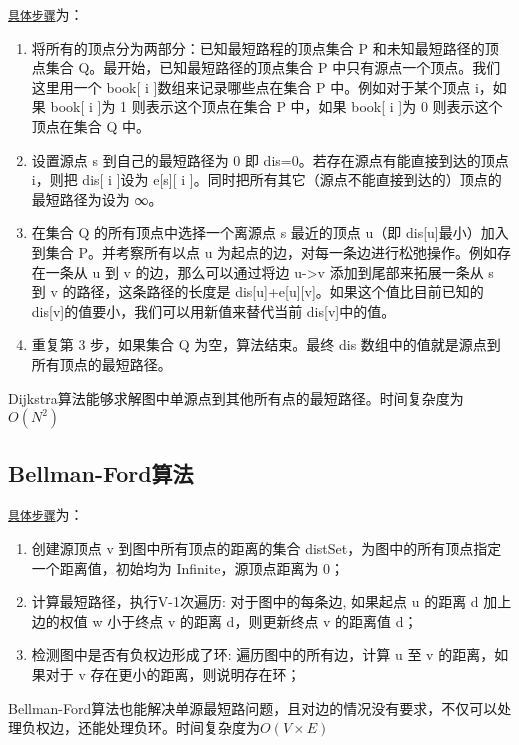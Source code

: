 \href{http://wiki.jikexueyuan.com/project/easy-learn-algorithm/dijkstra.html}{\texttt{具体步骤}}为：
\begin{enumerate}
\item 将所有的顶点分为两部分：已知最短路程的顶点集合 P 和未知最短路径的顶点集合 Q。最开始，已知最短路径的顶点集合 P 中只有源点一个顶点。我们这里用一个 book[ i ]数组来记录哪些点在集合 P 中。例如对于某个顶点 i，如果 book[ i ]为 1 则表示这个顶点在集合 P 中，如果 book[ i ]为 0 则表示这个顶点在集合 Q 中。
\item 设置源点 s 到自己的最短路径为 0 即 dis=0。若存在源点有能直接到达的顶点 i，则把 dis[ i ]设为 e[s][ i ]。同时把所有其它（源点不能直接到达的）顶点的最短路径为设为 ∞。
\item 在集合 Q 的所有顶点中选择一个离源点 s 最近的顶点 u（即 dis[u]最小）加入到集合 P。并考察所有以点 u 为起点的边，对每一条边进行松弛操作。例如存在一条从 u 到 v 的边，那么可以通过将边 u->v 添加到尾部来拓展一条从 s 到 v 的路径，这条路径的长度是 dis[u]+e[u][v]。如果这个值比目前已知的 dis[v]的值要小，我们可以用新值来替代当前 dis[v]中的值。
\item 重复第 3 步，如果集合 Q 为空，算法结束。最终 dis 数组中的值就是源点到所有顶点的最短路径。
\end{enumerate}

Dijkstra算法能够求解图中单源点到其他所有点的最短路径。时间复杂度为$O(N^2)$

\subsection{Bellman-Ford算法}
\href{http://www.cnblogs.com/gaochundong/p/bellman_ford_algorithm.html}{\texttt{具体步骤}}为：
\begin{enumerate}
	\item 创建源顶点 v 到图中所有顶点的距离的集合 distSet，为图中的所有顶点指定一个距离值，初始均为 Infinite，源顶点距离为 0；
	\item 计算最短路径，执行V-1次遍历: 对于图中的每条边, 如果起点 u 的距离 d 加上边的权值 w 小于终点 v 的距离 d，则更新终点 v 的距离值 d；
	\item 检测图中是否有负权边形成了环: 遍历图中的所有边，计算 u 至 v 的距离，如果对于 v 存在更小的距离，则说明存在环；
\end{enumerate}

Bellman-Ford算法也能解决单源最短路问题，且对边的情况没有要求，不仅可以处理负权边，还能处理负环。时间复杂度为$O(V\times E)$

